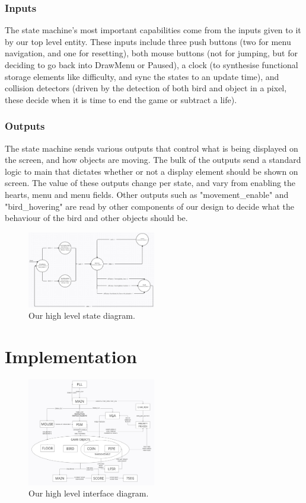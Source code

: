 \documentclass[conference]{IEEEtran}
\begin{document}
\subsubsection{Inputs}
The state machine's most important capabilities come from the inputs given to it by our top level entity. These inputs include three push buttons (two for menu navigation, and one for resetting), both mouse buttons (not for jumping, but for deciding to go back into DrawMenu or Paused), a clock (to synthesise functional storage elements like difficulty, and sync the states to an update time), and collision detectors (driven by the detection of both bird and object in a pixel, these decide when it is time to end the game or subtract a life).

\subsubsection{Outputs}
The state machine sends various outputs that control what is being displayed on the screen, and how objects are moving. The bulk of the outputs send a standard logic to main that dictates whether or not a display element should be shown on screen. The value of these outputs change per state, and vary from enabling the hearts, menu and menu fields. Other outputs such as "movement\_enable" and "bird\_hovering" are read by other components of our design to decide what the behaviour of the bird and other objects should be.

\begin{figure}[htbp]
    \centerline{\includegraphics[width=0.5\textwidth]{fsm.png}}
    \caption{Our high level state diagram.}
    \label{fig:fsm}
\end{figure}

\section{Implementation}
\begin{figure}[htbp]
    \centerline{\includegraphics[width=0.5\textwidth]{interfaces.png}}
    \caption{Our high level interface diagram.}
    \label{fig:interfaces}
\end{figure}
\end{document}
